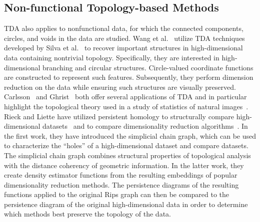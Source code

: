 \subsection{Non-functional Topology-based Methods}
TDA also applies to nonfunctional data, for which the connected components, circles, and voids in the data are studied.
%
Wang et al.~\cite{WangSummaPascucci2011} utilize TDA techniques developed by Silva et al.~\cite{SilvaMorozovVejdemo-Johansson2009} to recover important structures in high-dimensional data containing nontrivial topology.
%
Specifically, they are interested in high-dimensional branching and circular structures.
%
Circle-valued coordinate functions are constructed to represent such features.
%
Subsequently, they perform dimension reduction on the data while ensuring such structures are visually preserved.
%
Carlsson~\cite{Carlsson2009} and Ghrist~\cite{Ghrist2009} both offer several applications of TDA and in particular highlight the topological theory used in a study of statistics of natural images~\cite{LeePedersenMumford2003}.
%
Rieck and Liette have utilized persistent homology to structurally compare high-dimensional datasets~\cite{RieckLeitte2014} and to compare dimensionality reduction algorithms~\cite{RieckLeitte2015}.
%
In the first work, they have introduced the simplicial chain graph, which can be used to characterize the ``holes'' of a high-dimensional dataset and compare datasets.
%
The simplicial chain graph combines structural properties of topological analysis with the distance coherency of geometric information.
%
In the latter work, they create density estimator functions from the resulting embeddings of popular dimensionality reduction methods.
%
The persistence diagrams of the resulting functions applied to the original Rips graph can then be compared to the persistence diagram of the original high-dimensional data in order to determine which methods best preserve the topology of the data.

